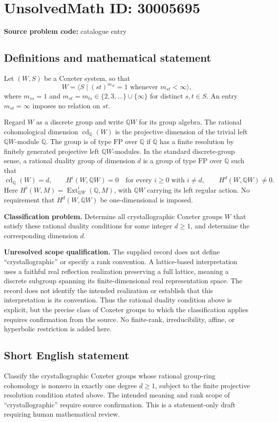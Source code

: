 \documentclass[11pt]{article}
\newcommand{\Q}{\mathbb{Q}}
\begin{document}
\section*{UnsolvedMath ID: 30005695}
\textbf{Source problem code:} catalogue entry
\subsection{Definitions and mathematical statement}
Let \((W,S)\) be a Coxeter system, so that
\[
W=\langle S\mid (st)^{m_{st}}=1\text{ whenever }m_{st}<\infty\rangle,
\]
where \(m_{ss}=1\) and \(m_{st}=m_{ts}\in\{2,3,\ldots\}\cup\{\infty\}\) for distinct \(s,t\in S\). An entry \(m_{st}=\infty\) imposes no relation on \(st\).

Regard \(W\) as a discrete group and write \(\Q W\) for its group algebra. The rational cohomological dimension \(\operatorname{cd}_{\Q}(W)\) is the projective dimension of the trivial left \(\Q W\)-module \(\Q\). The group is of type \(\mathrm{FP}\) over \(\Q\) if \(\Q\) has a finite resolution by finitely generated projective left \(\Q W\)-modules. In the standard discrete-group sense, a rational duality group of dimension \(d\) is a group of type \(\mathrm{FP}\) over \(\Q\) such that
\[
\operatorname{cd}_{\Q}(W)=d,\qquad
H^i(W,\Q W)=0\quad\text{for every }i\geq0\text{ with }i\neq d,
\qquad H^d(W,\Q W)\neq0.
\]
Here \(H^i(W,M)=\operatorname{Ext}^i_{\Q W}(\Q,M)\), with \(\Q W\) carrying its left regular action. No requirement that \(H^d(W,\Q W)\) be one-dimensional is imposed.

\textbf{Classification problem.} Determine all crystallographic Coxeter groups \(W\) that satisfy these rational duality conditions for some integer \(d\geq1\), and determine the corresponding dimension \(d\).

\textbf{Unresolved scope qualification.} The supplied record does not define ``crystallographic'' or specify a rank convention. A lattice-based interpretation uses a faithful real reflection realization preserving a full lattice, meaning a discrete subgroup spanning its finite-dimensional real representation space. The record does not identify the intended realization or establish that this interpretation is its convention. Thus the rational duality condition above is explicit, but the precise class of Coxeter groups to which the classification applies requires confirmation from the source. No finite-rank, irreducibility, affine, or hyperbolic restriction is added here.
\subsection{Short English statement}
Classify the crystallographic Coxeter groups whose rational group-ring cohomology is nonzero in exactly one degree \(d\geq1\), subject to the finite projective resolution condition stated above. The intended meaning and rank scope of ``crystallographic'' require source confirmation. This is a statement-only draft requiring human mathematical review.
\end{document}
